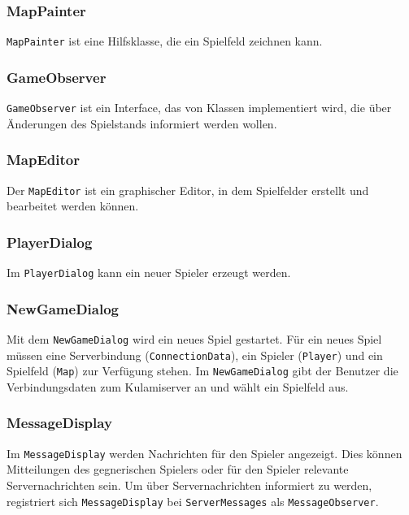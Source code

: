 \documentclass{scrartcl}
\begin{document}
\subsubsection{MapPainter}

\texttt{MapPainter} ist eine Hilfsklasse, die ein Spielfeld zeichnen kann.

\subsubsection{GameObserver}
\label{sec:GameObserver}

\texttt{GameObserver} ist ein Interface, das von Klassen implementiert wird, die über Änderungen des Spielstands informiert werden wollen.

\subsubsection{MapEditor}

Der \texttt{MapEditor} ist ein graphischer Editor, in dem Spielfelder erstellt und bearbeitet werden können.

\subsubsection{PlayerDialog}

Im \texttt{PlayerDialog} kann ein neuer Spieler erzeugt werden.

\subsubsection{NewGameDialog}

Mit dem \texttt{NewGameDialog} wird ein neues Spiel gestartet.  Für ein neues Spiel müssen eine Serverbindung (\texttt{ConnectionData}), ein Spieler (\texttt{Player}) und ein Spielfeld (\texttt{Map}) zur Verfügung stehen.  Im \texttt{NewGameDialog} gibt der Benutzer die Verbindungsdaten zum Kulamiserver an und wählt ein Spielfeld aus.

\subsubsection{MessageDisplay}

Im \texttt{MessageDisplay} werden Nachrichten für den Spieler angezeigt.  Dies können Mitteilungen des gegnerischen Spielers oder für den Spieler relevante Servernachrichten sein.  Um über Servernachrichten informiert zu werden, registriert sich \texttt{MessageDisplay} bei \texttt{ServerMessages} als \texttt{MessageObserver}.
\end{document}

